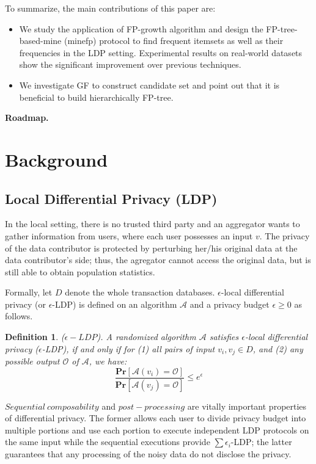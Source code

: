 \documentclass[conference]{IEEEtran}
\begin{document}
{\color{red}
To summarize, the main contributions of this paper are:
\begin{itemize}
\item We study the application of FP-growth algorithm and design the FP-tree-based-mine (minefp) protocol to find frequent itemsets as well as their frequencies in the LDP setting. Experimental results on real-world datasets show the significant improvement over previous techniques.
\item We investigate GF to construct candidate set and point out that it is beneficial to build hierarchically FP-tree. 
\end{itemize}
}


\textbf{Roadmap.}

\section{Background}
\subsection{Local Differential Privacy (LDP)}
In the local setting, there is no trusted third party and an aggregator wants to gather information from users, where each user possesses an input $v$. The privacy of the data contributor is protected by perturbing her/his original data at the data contributor’s side; thus, the agregator cannot access the original data, but is still able to obtain population statistics.

Formally, let $D$ denote the whole  transaction databases. $\epsilon$-local differential privacy (or $\epsilon$-LDP) is defined on an algorithm $\mathcal{A}$ and a privacy budget $\epsilon \geq 0$ as follows.

\newtheorem{Definition}{\bf Definition}
\begin{Definition}
($\epsilon-LDP$). A randomized algorithm $\mathcal{A}$ satisfies $\epsilon$-local differential privacy ($\epsilon$-LDP), if and only if for (1) all pairs of input $v_i,v_j \in D$, and (2) any possible output $\mathcal{O}$ of $\mathcal{A}$, we have:\\
$$\frac{\mathbf{Pr}[\mathcal{A}(v_i)=\mathcal{O}]}{\mathbf{Pr}[\mathcal{A}(v_j)=\mathcal{O}]} \leq e^{\epsilon}$$
\end{Definition}

$Sequential\  composability$\cite{a9} and $post-processing$\cite{post-processing} are vitally important properties of differential privacy. The former allows each user to divide privacy budget into multiple portions and use each portion to execute independent LDP protocols on the same input while the sequential executions provide $\sum \epsilon_i$-LDP; the latter guarantees that any processing of the noisy data do not disclose the privacy.
\end{document}
